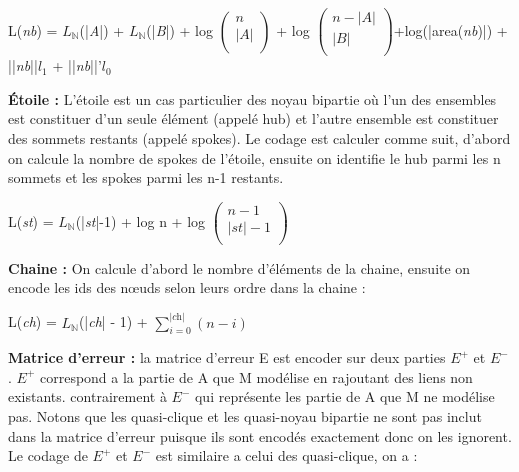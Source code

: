 \begin{center}
L(\textit{nb}) = $L_{\mathbb{N}}$(|\textit{A}|) + $L_{\mathbb{N}}$(|\textit{B}|) + log $\left( \begin{array}{c}
n \\
|\textit{A}| \\
\end{array} \right)$ + log $\left( \begin{array}{c}
n - |\textit{A}|\\
|\textit{B}| \\
\end{array} \right)$+log(|area(\textit{nb})|) + ||\textit{nb}||\textit{$l_{1}$} + ||\textit{nb}||'\textit{$l_{0}$}\\
\end{center}
\textbf{Étoile :} L'étoile est un cas particulier des noyau bipartie où l'un des ensembles est constituer d'un seule élément (appelé hub) et l'autre ensemble est constituer des sommets restants (appelé spokes). Le codage est calculer comme suit, d'abord on calcule la nombre de spokes de l'étoile, ensuite on identifie le hub parmi les n sommets et les spokes parmi les n-1 restants.

\begin{center}
L(\textit{st}) = $L_{\mathbb{N}}$(|\textit{st}|-1) +  log n + log $\left( \begin{array}{c}
n - 1  \\
|\textit{st}| - 1 \\
\end{array} \right)$ \\
\end{center}
\textbf{Chaine :} On calcule d'abord le nombre d'éléments de la chaine, ensuite on encode les ids des nœuds selon leurs ordre dans la chaine :

\begin{center}
L(\textit{ch}) = $L_{\mathbb{N}}$(|\textit{ch}| - 1) + $\sum\limits_{i=0}^{|\textit{ch}|} ( n - i )$\\
\end{center}
\textbf{Matrice d'erreur :} la matrice d'erreur E est encoder sur deux parties $E^{+}$ et $E^{-}$. $E^{+}$  correspond a la partie de A que M modélise en rajoutant des liens non existants. contrairement à $E^{-}$ qui représente les partie de A que M ne modélise pas. Notons que les quasi-clique et les quasi-noyau bipartie ne sont pas inclut dans la matrice d'erreur puisque ils sont encodés exactement donc on les ignorent. Le codage de $E^{+}$ et $E^{-}$ est similaire a celui des quasi-clique, on a :

